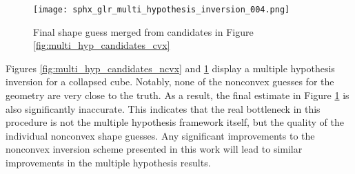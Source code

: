 \begin{figure}[!htb]
\centering
\texttt{[image: sphx\_glr\_multi\_hypothesis\_inversion\_004.png]}
\caption{Final shape guess merged from candidates in Figure \ref{fig:multi_hyp_candidates_cvx}}
\label{fig:multi_hyp_final_ncvx}
\end{figure}

Figures \ref{fig:multi_hyp_candidates_ncvx} and \ref{fig:multi_hyp_final_ncvx} display a multiple hypothesis inversion for a collapsed cube. Notably, none of the nonconvex guesses for the geometry are very close to the truth. As a result, the final estimate in Figure \ref{fig:multi_hyp_final_ncvx} is also significantly inaccurate. This indicates that the real bottleneck in this procedure is not the multiple hypothesis framework itself, but the quality of the individual nonconvex shape guesses. Any significant improvements to the nonconvex inversion scheme presented in this work will lead to similar improvements in the multiple hypothesis results.